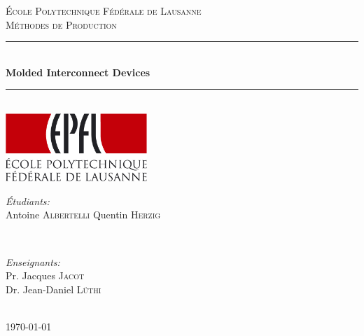 \begin{titlepage}

\newcommand{\HRule}{\rule{\linewidth}{0.5mm}} %

\center %
\textsc{\LARGE École Polytechnique Fédérale de Lausanne}\\[1.5cm] %
\textsc{\Large Méthodes de Production}\\[0.5cm] %

\HRule \\[0.4cm]
{ \huge \bfseries Molded Interconnect Devices}\\[0.4cm] %
\HRule \\[1.5cm]
 
\includegraphics[width=0.4\textwidth]{epfl_logo}\\[3cm] 


\vfill %
\begin{minipage}{0.4\textwidth}
\begin{flushleft} \large
\emph{Étudiants:}\\
Antoine \textsc{Albertelli} 
Quentin \textsc{Herzig}
\end{flushleft}
\end{minipage}
~
\begin{minipage}{0.4\textwidth}
\begin{flushright} \large
\emph{Enseignants:} \\
Pr. Jacques \textsc{Jacot} \\
Dr. Jean-Daniel \textsc{Lüthi}
\end{flushright}
\end{minipage}\\[2cm]


{\large \today}
\end{titlepage}


